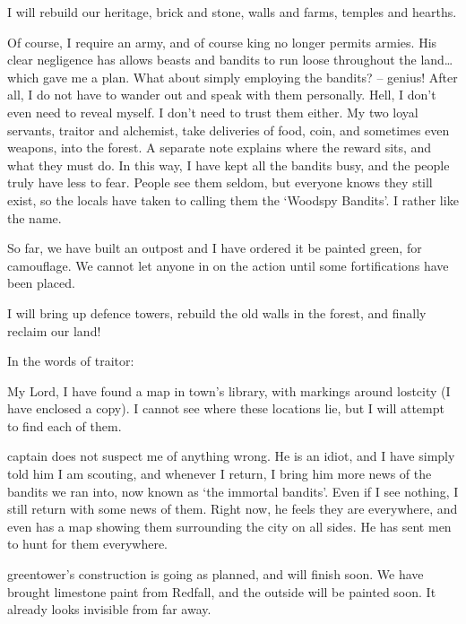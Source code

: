 \begin{multicols}{2}
\begin{exampletext}
  I will rebuild our heritage, brick and stone, walls and farms, temples and hearths.

  Of course, I require an army, and of course \gls{king} no longer permits armies.
  His clear negligence has allows beasts and bandits to run loose throughout the land\ldots which gave me a plan.
  What about simply employing the bandits? -- genius!
  After all, I do not have to wander out and speak with them personally.
  Hell, I don't even need to reveal myself.
  I don't need to trust them either.
  My two loyal servants, \gls{traitor} and \gls{alchemist}, take deliveries of food, coin, and sometimes even weapons, into the forest.
  A separate note explains where the reward sits, and what they must do.
  In this way, I have kept all the bandits busy, and the people truly have less to fear.
  People see them seldom, but everyone knows they still exist, so the locals have taken to calling them the `Woodspy Bandits'.
  I rather like the name.

  So far, we have built an outpost and I have ordered it be painted green, for camouflage.
  We cannot let anyone in on the action until some fortifications have been placed.
  
  I will bring up defence towers, rebuild the old walls in the forest, and finally reclaim our land!

\end{exampletext}

In the words of \gls{traitor}:

\begin{exampletext}

  My Lord,
  I have found a map in \gls{town}'s library, with markings around \gls{lostcity} (I have enclosed a copy).
  I cannot see where these locations lie, but I will attempt to find each of them.

  \Gls{captain} does not suspect me of anything wrong.
  He is an idiot, and I have simply told him I am scouting, and whenever I return, I bring him more news of the bandits we ran into, now known as `the immortal bandits'.
  Even if I see nothing, I still return with some news of them.
  Right now, he feels they are everywhere, and even has a map showing them surrounding the city on all sides.
  He has sent men to hunt for them everywhere.

  \Gls{greentower}'s construction is going as planned, and will finish soon.
  We have brought limestone paint from Redfall, and the outside will be painted soon.
  It already looks invisible from far away.


\end{exampletext}
\end{multicols}

